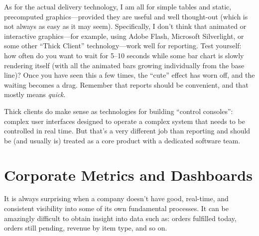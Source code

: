As for the actual delivery technology, I am all for simple tables and
static, precomputed graphics---provided they are useful and well
thought-out (which is not always as easy as it may seem).
Specifically, I don't think that animated or interactive
graphics---for example, using Adobe Flash, Microsoft Silverlight, or
some other ``Thick Client'' technology---work well for reporting. Test
yourself: how often do you want to wait for 5--10 seconds while some
bar chart is slowly rendering itself (with all the animated bars
growing individually from the base line)? Once you have seen this a
few times, the ``cute'' effect has worn off, and the waiting becomes a
drag.  Remember that reports should be convenient, and that mostly
means \emph{quick}.

Thick clients do make sense as technologies for building ``control
consoles'': complex user interfaces designed to operate a complex
system that needs to be controlled in real time.  But that's a very
different job than reporting and should be (and usually is) treated
as a core product with a dedicated software team.





\section{Corporate Metrics and Dashboards}


It is always surprising when a company doesn't have good, real-time,
and consistent visibility into some of its own fundamental processes.
It can be amazingly difficult to obtain insight into data such as:
orders fulfilled today, orders still pending, revenue by item type,
and so on.
    
